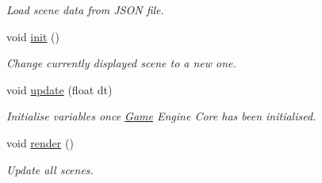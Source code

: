\begin{DoxyCompactItemize}
\begin{DoxyCompactList}\small\item\em Load scene data from J\+S\+O\+N file. \end{DoxyCompactList}\item 
\hypertarget{class_game_a6f3a33940524b6ba9d83f627ccb14bbf}{void \hyperlink{class_game_a6f3a33940524b6ba9d83f627ccb14bbf}{init} ()}\label{class_game_a6f3a33940524b6ba9d83f627ccb14bbf}

\begin{DoxyCompactList}\small\item\em Change currently displayed scene to a new one. \end{DoxyCompactList}\item 
\hypertarget{class_game_a2648dc91da0dd1424d5b7c45510515a0}{void \hyperlink{class_game_a2648dc91da0dd1424d5b7c45510515a0}{update} (float dt)}\label{class_game_a2648dc91da0dd1424d5b7c45510515a0}

\begin{DoxyCompactList}\small\item\em Initialise variables once \hyperlink{class_game}{Game} Engine Core has been initialised. \end{DoxyCompactList}\item 
\hypertarget{class_game_a15ddd769261d923827a3cdf41499c843}{void \hyperlink{class_game_a15ddd769261d923827a3cdf41499c843}{render} ()}\label{class_game_a15ddd769261d923827a3cdf41499c843}

\begin{DoxyCompactList}\small\item\em Update all scenes. \end{DoxyCompactList}\end{DoxyCompactItemize}
